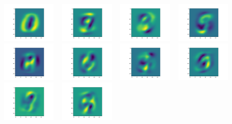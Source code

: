 \documentclass{article}
\begin{document}
 \\
\includegraphics[width=3cm, height=2cm]{plots/A6d/A6d_0.png}
\includegraphics[width=3cm, height=2cm]{plots/A6d/A6d_1.png}
\includegraphics[width=3cm, height=2cm]{plots/A6d/A6d_2.png}
\includegraphics[width=3cm, height=2cm]{plots/A6d/A6d_3.png}
\includegraphics[width=3cm, height=2cm]{plots/A6d/A6d_4.png}
\includegraphics[width=3cm, height=2cm]{plots/A6d/A6d_5.png}
\includegraphics[width=3cm, height=2cm]{plots/A6d/A6d_6.png}
\includegraphics[width=3cm, height=2cm]{plots/A6d/A6d_7.png}
\includegraphics[width=3cm, height=2cm]{plots/A6d/A6d_8.png}
\includegraphics[width=3cm, height=2cm]{plots/A6d/A6d_9.png} \\
\end{document}
